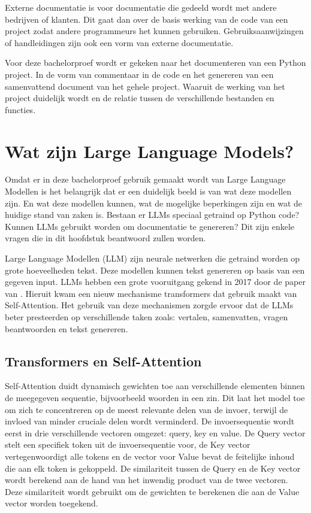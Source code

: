 Externe documentatie is voor documentatie die gedeeld wordt met andere bedrijven of klanten. 
Dit gaat dan over de basis werking van de code van een project zodat andere programmeurs het kunnen gebruiken.
Gebruiksaanwijzingen of handleidingen zijn ook een vorm van externe documentatie. \autocite{swimm.io2024}

Voor deze bachelorproef wordt er gekeken naar het documenteren van een Python project.
In de vorm van commentaar in de code en het genereren van een samenvattend document van het gehele project.
Waaruit de werking van het project duidelijk wordt en de relatie tussen de verschillende bestanden en functies.

\section{Wat zijn Large Language Models?}
\label{sec:wat-zijn-llms}

Omdat er in deze bachelorproef gebruik gemaakt wordt van Large Language Modellen is het belangrijk dat er een duidelijk beeld is van wat deze modellen zijn.
En wat deze modellen kunnen, wat de mogelijke beperkingen zijn en wat de huidige stand van zaken is. 
Bestaan er LLMs speciaal getraind op Python code? Kunnen LLMs gebruikt worden om documentatie te genereren? 
Dit zijn enkele vragen die in dit hoofdstuk beantwoord zullen worden. 

Large Language Modellen (LLM) zijn neurale netwerken die getraind worden op grote hoeveelheden tekst. 
Deze modellen kunnen tekst genereren op basis van een gegeven input. 
LLMs hebben een grote vooruitgang gekend in 2017 door de paper van \textcite{VaswaniEtAl2017}. 
Hieruit kwam een nieuw mechanisme transformers dat gebruik maakt van Self-Attention. 
Het gebruik van deze mechanismen zorgde ervoor dat de LLMs beter presteerden op verschillende taken zoals: vertalen, samenvatten, vragen beantwoorden en tekst genereren.

\subsection{{Transformers en Self-Attention}}
\label{sec:transformers-en-self-attention}
Self-Attention duidt dynamisch gewichten toe aan verschillende elementen binnen de meegegeven sequentie, bijvoorbeeld woorden in een zin.
Dit laat het model toe om zich te concentreren op de meest relevante delen van de invoer, terwijl de invloed van minder cruciale delen wordt verminderd.
De invoersequentie wordt eerst in drie verschillende vectoren omgezet: query, key en value.
De Query vector stelt een specifiek token uit de invoersequentie voor, de Key vector vertegenwoordigt alle tokens en de vector voor Value bevat de feitelijke inhoud die aan elk token is gekoppeld.
De similariteit tussen de Query en de Key vector wordt berekend aan de hand van het inwendig product van de twee vectoren.
Deze similariteit wordt gebruikt om de gewichten te berekenen die aan de Value vector worden toegekend.

